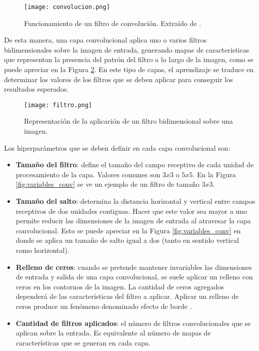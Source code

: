\begin{figure}[H]
  \centering{}
  \texttt{[image: convolucion.png]}
  \caption{Funcionamiento de un filtro de convolución. Extraído de \cite{dragon}.}
  \label{fig:convolucion}
\end{figure}

De esta manera, una capa convolucional aplica uno o varios filtros bidimensionales sobre la imagen de entrada, generando mapas de características que representan la presencia del patrón del filtro a lo largo de la imagen, como se puede apreciar en la Figura \ref{fig:numerito}. En este tipo de capas, el aprendizaje se traduce en determinar los valores de los filtros que se deben aplicar para conseguir los resultados esperados. 

\begin{figure}[H]
  \centering{}
  \texttt{[image: filtro.png]}
  \caption{Representación de la aplicación de un filtro bidimensional sobre una imagen.}
  \label{fig:numerito}
\end{figure}

Los hiperparámetros que se deben definir en cada capa convolucional son: 

\begin{itemize}
\item\textbf{Tamaño del filtro}: define el tamaño del campo receptivo de cada unidad de procesamiento de la capa. Valores comunes son $3x3$ o $5x5$. En la Figura \ref{fig:variables_conv} se ve un ejemplo de un filtro de tamaño $3x3$.

\item\textbf{Tamaño del salto}: determina la distancia horizontal y vertical entre campos receptivos de dos unidades contiguas. Hacer que este valor sea mayor a uno permite reducir las dimensiones de la imagen de entrada al atravesar la capa convolucional. Esto se puede apreciar en la Figura \ref{fig:variables_conv} en donde se aplica un tamaño de salto igual a dos (tanto en sentido vertical como horizontal). 

\item\textbf{Relleno de ceros}: cuando se pretende mantener invariables las dimensiones de entrada y salida de una capa convolucional, se suele aplicar un relleno con ceros en los contornos de la imagen. La cantidad de ceros agregados dependerá de las características del filtro a aplicar. Aplicar un relleno de ceros produce un fenómeno denominado efecto de borde \cite{lagartija}. 

\item\textbf{Cantidad de filtros aplicados}: el número de filtros convolucionales que se aplican sobre la entrada. Es equivalente al número de mapas de características que se generan en cada capa. 

\end{itemize}

